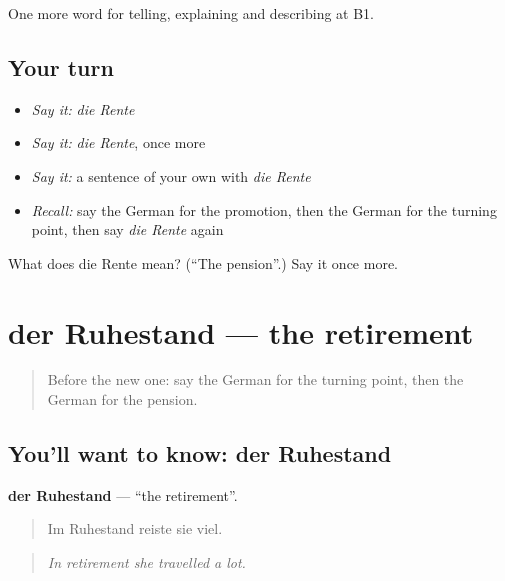 \begin{grammarlens}[title={What you've built}]
One more word for telling, explaining and describing at B1.
\end{grammarlens}

\subsection*{Your turn}
\begin{itemize}
\raggedright
  \item \emph{Say it:} \emph{die Rente}
  \item \emph{Say it:} \emph{die Rente}, once more
  \item \emph{Say it:} a sentence of your own with \emph{die Rente}
  \item \emph{Recall:} say the German for the promotion, then the German for the turning point, then say \emph{die Rente} again
\end{itemize}

\begin{tcolorbox}[breakable,colback=teal!4,colframe=teal!35!black,title={Before you move on}]
What does die Rente mean? (\textquotedblleft{}The pension\textquotedblright{}.) Say it once more.
\end{tcolorbox}
\section[der Ruhestand]{der Ruhestand — the retirement}

\label{lesson:GE-C302-ruhestand}



\begin{quote}
Before the new one: say the German for the turning point, then the German for the pension.
\end{quote}

\subsection*{You'll want to know: der Ruhestand}
\textbf{der Ruhestand} — \textquotedblleft{}the retirement\textquotedblright{}.

\begin{quote}
Im Ruhestand reiste sie viel.
\end{quote}

\begin{quote}
\emph{In retirement she travelled a lot.}
\end{quote}


